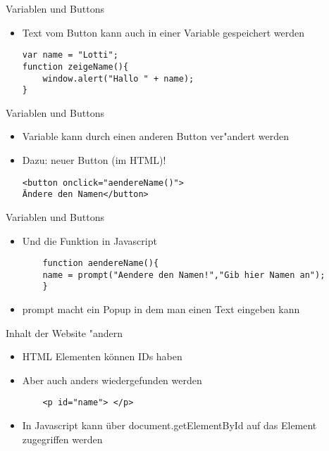 \documentclass[18pt]{beamer}
\begin{document}
\begin{frame}[fragile]{Variablen und Buttons}
\begin{itemize}
\item Text vom Button kann auch in einer Variable gespeichert werden
\begin{lstlisting}
var name = "Lotti";
function zeigeName(){
	window.alert("Hallo " + name);
}
\end{lstlisting}
\end{itemize}
\end{frame}


\begin{frame}[fragile]{Variablen und Buttons}
\begin{itemize}
\item Variable kann durch einen anderen Button ver"andert werden
\item Dazu: neuer Button (im HTML)!
\begin{lstlisting}
<button onclick="aendereName()">
Ändere den Namen</button>
\end{lstlisting}
\end{itemize}
\end{frame}


\begin{frame}[fragile]{Variablen und Buttons}
\begin{itemize}
	\item Und die Funktion in Javascript 
	\begin{lstlisting}
	function aendereName(){
	name = prompt("Aendere den Namen!","Gib hier Namen an");
	}
	\end{lstlisting}
	\item prompt macht ein Popup in dem man einen Text eingeben kann
\end{itemize}
\end{frame}

\begin{frame}[fragile]{Inhalt der Website "andern}
\begin{itemize}
\item HTML Elementen können IDs haben
\item Aber auch anders wiedergefunden werden
\begin{lstlisting}
	<p id="name"> </p>
\end{lstlisting}
\item In Javascript kann über document.getElementById auf das Element zugegriffen werden
\end{itemize}
\end{frame}
\end{document}
